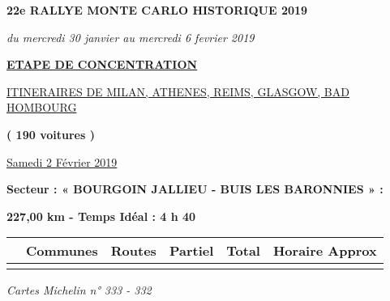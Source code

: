 \documentclass{article}%
\begin{document}
%
\normalsize%
\begin{center} \textbf{\LARGE{22e RALLYE MONTE CARLO HISTORIQUE 2019}} \end{center}%
\begin{flushleft} \textit{du mercredi 30 janvier au mercredi 6 fevrier 2019} \end{flushleft}%
\begin{center} \textbf{\underline{ETAPE DE CONCENTRATION}} \end{center}%
\begin{center} \underline{ITINERAIRES DE MILAN, ATHENES, REIMS, GLASGOW, BAD HOMBOURG} \end{center}%
\begin{center} \textbf{( 190 voitures )} \end{center}%
\begin{flushright} \underline{ Samedi 2 Février 2019} \end{flushright}%
\begin{flushleft} \textbf{Secteur : « BOURGOIN  JALLIEU - BUIS LES BARONNIES » :
} \end{flushleft}%
\begin{flushright} \textbf{227,00 km - Temps Idéal : 4 h 40} \end{flushright}%
\begin{longtable}{p{2.25cm}|p{7.0cm}|p{1.5cm}|p{1.5cm}|p{1.5cm}|p{3.5cm}}%
\hline%
&Communes&Routes&Partiel&Total&Horaire Approx\\%
\hline%
\endhead%
\endfoot%
\endlastfoot%
\hline%
\end{longtable}%
\begin{flushleft} \textit{Cartes Michelin n° 333 - 332
} \end{flushleft}%
\end{document}
